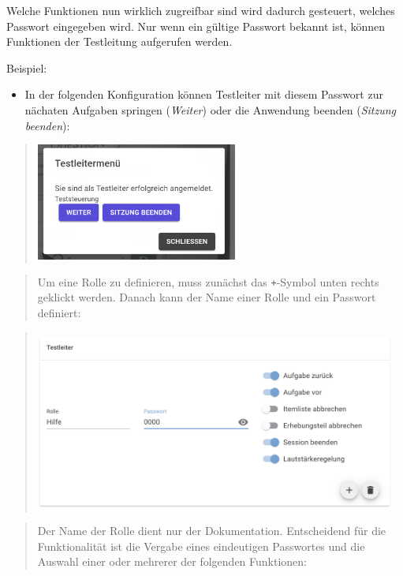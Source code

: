 \documentclass[
  letterpaper,
  DIV=11]{scrreprt}
\providecommand{\tightlist}{%
  \setlength{\itemsep}{0pt}\setlength{\parskip}{0pt}}\usepackage{longtable,booktabs,array}
\begin{document}
\begin{tcolorbox}
Welche Funktionen nun wirklich zugreifbar sind wird dadurch gesteuert,
welches Passwort eingegeben wird. Nur wenn ein gültige Passwort bekannt
ist, können Funktionen der Testleitung aufgerufen werden.

Beispiel:

\begin{itemize}
\tightlist
\item
  In der folgenden Konfiguration können Testleiter mit diesem Passwort
  zur nächaten Aufgaben springen (\emph{Weiter}) oder die Anwendung
  beenden (\emph{Sitzung beenden}):
\end{itemize}

\begin{quote}
\includegraphics[width=2.60417in,height=\textheight]{img/screenshot-test-adminstrator-menue-two-functions-example-01-DEU.png}
\end{quote}

\begin{quote}
Um eine Rolle zu definieren, muss zunächst das \texttt{+}-Symbol unten
rechts geklickt werden. Danach kann der Name einer Rolle und ein
Passwort definiert:
\end{quote}

\begin{quote}
\includegraphics[width=4.6875in,height=\textheight]{img/screenshot-test-adminstrator-menue-example-configuration-01-DEU.png}
\end{quote}

\begin{quote}
Der Name der Rolle dient nur der Dokumentation. Entscheidend für die
Funktionalität ist die Vergabe eines eindeutigen Passwortes und die
Auswahl einer oder mehrerer der folgenden Funktionen:
\end{quote}


\end{tcolorbox}
\end{document}
